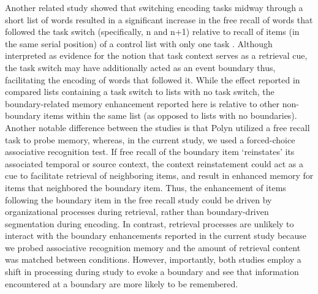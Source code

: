 Another related study showed that switching encoding tasks midway
through a short list of words resulted in a significant increase in the
free recall of words that followed the task switch (specifically, n and
n+1) relative to recall of items (in the same serial position) of a
control list with only one task \autocite{polyn_task_2009}. Although
interpreted as evidence for the notion that task context serves as a
retrieval cue, the task switch may have additionally acted as an event
boundary thus, facilitating the encoding of words that followed it.
While the effect reported in \textcite{polyn_task_2009} compared lists
containing a task switch to lists with no task switch, the
boundary-related memory enhancement reported here is relative to other
non-boundary items within the same list (as opposed to lists with no
boundaries). Another notable difference between the studies is that
Polyn utilized a free recall task to probe memory, whereas, in the
current study, we used a forced-choice associative recognition test. If
free recall of the boundary item `reinstates' its associated temporal
\autocites{howard_distributed_2002}{polyn_context_2009} or source
\autocites{frost_clustering_1971}{hintzman_memory_1972}{murdock_modality_1969}{nilsson_further_1974}{polyn_task_2009}
context, the context reinstatement could act as a cue to facilitate
retrieval of neighboring items, and result in enhanced memory for items
that neighbored the boundary item. Thus, the enhancement of items
following the boundary item in the free recall study could be driven by
organizational processes during retrieval, rather than boundary-driven
segmentation during encoding. In contrast, retrieval processes are
unlikely to interact with the boundary enhancements reported in the
current study because we probed associative recognition memory and the
amount of retrieval content was matched between conditions. However,
importantly, both studies employ a shift in processing during study to
evoke a boundary and see that information encountered at a boundary are
more likely to be remembered.

